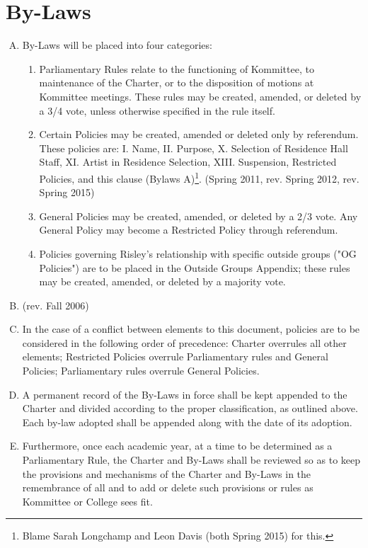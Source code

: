 \documentclass[12pt]{article}
\begin{document}
\section{By-Laws}
\begin{enumerate}[A.]
\item By-Laws will be placed into four categories:
\begin{enumerate}[1.]
\item Parliamentary Rules relate to the functioning of Kommittee, to maintenance of the Charter, or to the disposition of motions at Kommittee meetings. These rules may be created, amended, or deleted by a 3/4 vote, unless otherwise specified in the rule itself.
\item Certain Policies may be created, amended or deleted only by referendum. These policies are: I. Name, II. Purpose, X. Selection of Residence Hall Staff, XI. Artist in Residence Selection, XIII. Suspension, Restricted Policies, and this clause (Bylaws A)\footnote{Blame Sarah Longchamp and Leon Davis (both Spring 2015) for this.}. (Spring 2011, rev. Spring 2012, rev. Spring 2015)
\item General Policies may be created, amended, or deleted by a 2/3 vote. Any General Policy may become a Restricted Policy through referendum.
\item Policies governing Risley's relationship with specific outside groups ("OG Policies") are to be placed in the Outside Groups Appendix; these rules may be created, amended, or deleted by a majority vote.
\end{enumerate}
\item (rev. Fall 2006)
\item In the case of a conflict between elements to this document, policies are to be considered in the following order of precedence: Charter overrules all other elements; Restricted Policies overrule Parliamentary rules and General Policies; Parliamentary rules overrule General Policies.
\item A permanent record of the By-Laws in force shall be kept appended to the Charter and divided according to the proper classification, as outlined above. Each by-law adopted shall be appended along with the date of its adoption.
\item Furthermore, once each academic year, at a time to be determined as a Parliamentary Rule, the Charter and By-Laws shall be reviewed so as to keep the provisions and mechanisms of the Charter and By-Laws in the remembrance of all and to add or delete such provisions or rules as Kommittee or College sees fit.
\end{enumerate}
\end{document}
